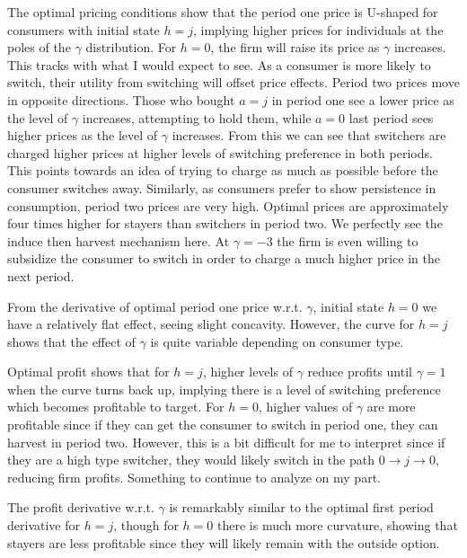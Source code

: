 \documentclass[11pt]{article}
\begin{document}
The optimal pricing conditions show that the period one price is U-shaped for consumers with initial state $h=j$, implying higher prices for individuals at the poles of the $\gamma$ distribution. For $h=0$, the firm will raise its price as $\gamma$ increases. This tracks with what I would expect to see. As a consumer is more likely to switch, their utility from switching will offset price effects. Period two prices move in opposite directions. Those who bought $a=j$ in period one see a lower price as the level of $\gamma$ increases, attempting to hold them, while $a=0$ last period sees higher prices as the level of $\gamma$ increases. From this we can see that switchers are charged higher prices at higher levels of switching preference in both periods. This points towards an idea of trying to charge as much as possible before the consumer switches away. Similarly, as consumers prefer to show persistence in consumption, period two prices are very high. Optimal prices are approximately four times higher for stayers than switchers in period two. We perfectly see the induce then harvest mechanism here. At $\gamma=-3$ the firm is even willing to subsidize the consumer to switch in order to charge a much higher price in the next period.

From the derivative of optimal period one price w.r.t. $\gamma$, initial state $h=0$ we have a relatively flat effect, seeing slight concavity. However, the curve for $h=j$ shows that the effect of $\gamma$ is quite variable depending on consumer type.

Optimal profit shows that for $h=j$, higher levels of $\gamma$ reduce profits until $\gamma=1$ when the curve turns back up, implying there is a level of switching preference which becomes profitable to target. For $h=0$, higher values of $\gamma$ are more profitable since if they can get the consumer to switch in period one, they can harvest in period two. However, this is a bit difficult for me to interpret since if they are a high type switcher, they would likely switch in the path $0\rightarrow j\rightarrow 0$, reducing firm profits. Something to continue to analyze on my part.

The profit derivative w.r.t. $\gamma$ is remarkably similar to the optimal first period derivative for $h=j$, though for $h=0$ there is much more curvature, showing that stayers are less profitable since they will likely remain with the outside option. 
\end{document}
